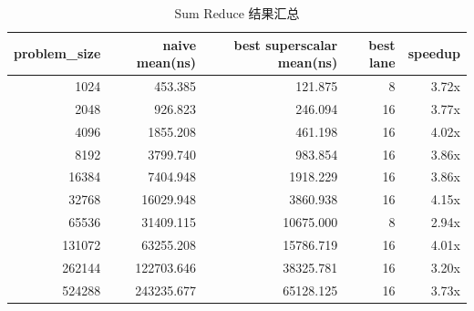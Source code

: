 \begin{table}[H]
\centering
\caption{Sum Reduce 结果汇总}
\label{tab:sum_reduce_after_fix_results}
\small
\begin{tabular}{r r r r r}
\toprule
problem\_size & naive mean(ns) & best superscalar mean(ns) & best lane & speedup \\
\midrule
1024 & 453.385 & 121.875 & 8 & 3.72x \\
2048 & 926.823 & 246.094 & 16 & 3.77x \\
4096 & 1855.208 & 461.198 & 16 & 4.02x \\
8192 & 3799.740 & 983.854 & 16 & 3.86x \\
16384 & 7404.948 & 1918.229 & 16 & 3.86x \\
32768 & 16029.948 & 3860.938 & 16 & 4.15x \\
65536 & 31409.115 & 10675.000 & 8 & 2.94x \\
131072 & 63255.208 & 15786.719 & 16 & 4.01x \\
262144 & 122703.646 & 38325.781 & 16 & 3.20x \\
524288 & 243235.677 & 65128.125 & 16 & 3.73x \\
\bottomrule
\end{tabular}
\end{table}